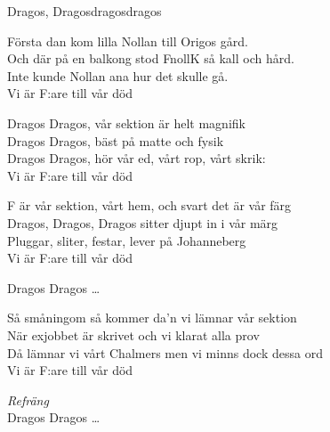 \begin{song}{Dragos, Dragos}{dragosdragos}

\begin{vers}
Första dan kom lilla Nollan till Origos gård.\\ 
Och där på en balkong stod FnollK så kall och hård.\\
Inte kunde Nollan ana hur det skulle gå.\\
Vi är F:are till vår död \\
\end{vers}

\begin{vers}
Dragos Dragos, vår sektion är helt magnifik \\
Dragos Dragos, bäst på matte och fysik \\
Dragos Dragos, hör vår ed, vårt rop, vårt skrik:\\
Vi är F:are till vår död \\
\end{vers}

\begin{vers}
F är vår sektion, vårt hem, och svart det är vår färg\\
Dragos, Dragos, Dragos sitter djupt in i vår märg\\
Pluggar, sliter, festar, lever på Johanneberg\\
Vi är F:are till vår död\\
\end{vers}

\begin{vers}
Dragos Dragos \ldots
\end{vers}

\begin{vers}
Så småningom så kommer da'n vi lämnar vår sektion\\
När exjobbet är skrivet och vi klarat alla prov\\
Då lämnar vi vårt Chalmers men vi minns dock dessa ord\\
Vi är F:are till vår död\\
\end{vers}

\begin{vers}
\textit{Refräng}\\
Dragos Dragos \ldots
\end{vers}
\end{song}

